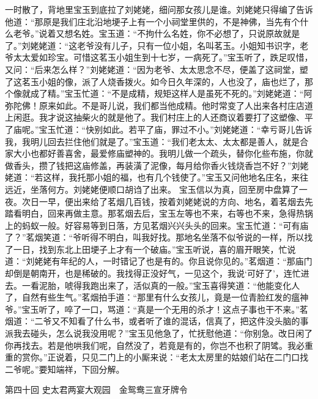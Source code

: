 \documentclass[12pt,oneside]{book}
\begin{document}
一时散了，背地里宝玉到底拉了刘姥姥，细问那女孩儿是谁。刘姥姥只得编了告诉他道：“那原是我们庄北沿地埂子上有一个小祠堂里供的，不是神佛，当先有个什么老爷。”说着又想名姓。宝玉道：“不拘什么名姓，你不必想了，只说原故就是了。”刘姥姥道：“这老爷没有儿子，只有一位小姐，名叫茗玉。小姐知书识字，老爷太太爱如珍宝。可惜这茗玉小姐生到十七岁，一病死了。”宝玉听了，跌足叹惜，又问：“后来怎么样？”刘姥姥道：“因为老爷、太太思念不尽，便盖了这祠堂，塑了这茗玉小姐的像，派了人烧香拨火。如今日久年深的，人也没了，庙也烂了，那个像就成了精。”宝玉忙道：“不是成精，规矩这样人是虽死不死的。”刘姥姥道：“阿弥陀佛！原来如此。不是哥儿说，我们都当他成精。他时常变了人出来各村庄店道上闲逛。我才说这抽柴火的就是他了。我们村庄上的人还商议着要打了这塑像、平了庙呢。”宝玉忙道：“快别如此。若平了庙，罪过不小。”刘姥姥道：“幸亏哥儿告诉我，我明儿回去拦住他们就是了。”宝玉道：“我们老太太、太太都是善人，就是合家大小也都好善喜舍，最爱修庙塑神的。我明儿做一个疏头，替你化些布施，你就做香头，攒了钱把这庙修盖，再装潢了泥像，每月给你香火钱烧香岂不好？”刘姥姥道：“若这样，我托那小姐的福，也有几个钱使了。”宝玉又问他地名庄名，来往远近，坐落何方。刘姥姥便顺口胡诌了出来。
宝玉信以为真，回至房中盘算了一夜。次日一早，便出来给了茗烟几百钱，按着刘姥姥说的方向、地名，着茗烟去先踏看明白，回来再做主意。那茗烟去后，宝玉左等也不来，右等也不来，急得热锅上的蚂蚁一般。好容易等到日落，方见茗烟兴兴头头的回来。宝玉忙道：“可有庙了？”茗烟笑道：“爷听得不明白，叫我好找。那地名坐落不似爷说的一样，所以找了一日，找到东北上田埂子上才有一个破庙。”宝玉听说，喜的眉开眼笑，忙说道：“刘姥姥有年纪的人，一时错记了也是有的。你且说你见的。”茗烟道：“那庙门却倒是朝南开，也是稀破的。我找得正没好气，一见这个，我说‘可好了’，连忙进去。一看泥胎，唬得我跑出来了，活似真的一般。”宝玉喜得笑道：“他能变化人了，自然有些生气。”茗烟拍手道：“那里有什么女孩儿，竟是一位青脸红发的瘟神爷。”宝玉听了，啐了一口，骂道：“真是一个无用的杀才！这点子事也干不来。”茗烟道：“二爷又不知看了什么书，或者听了谁的混话，信真了，把这件没头脑的事派我去碰头，怎么说我没用呢？”宝玉见他急了，忙抚慰他道：“你别急。改日闲了你再找去。若是他哄我们呢，自然没了，若竟是有的，你岂不也积了阴骘。我必重重的赏你。”正说着，只见二门上的小厮来说：“老太太房里的姑娘们站在二门口找二爷呢。”要知端祥，下回分解。
 
第四十回  史太君两宴大观园　金鸳鸯三宣牙牌令
\end{document}
